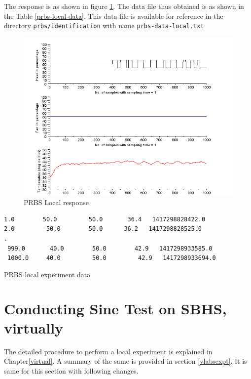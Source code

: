 The response is as shown in figure \ref{prbs-test-local}. The data file thus obtained is as shown in the Table \ref{prbs-local-data}. This data file is available for reference in the directory {\tt prbs/identification} with name {\tt prbs-data-local.txt}


\begin{figure}
\centering
\includegraphics[width=0.7\linewidth]{prbs/prbs-local.png}
\caption{PRBS Local response}
\label{prbs-test-local}
\end{figure}

\begin{table}
\begin{verbatim}
1.0        50.0         50.0       36.4   1417298828422.0
2.0         50.0        50.0      36.2   1417298828525.0
.
 999.0       40.0        50.0        42.9   1417298933585.0
 1000.0     40.0         50.0         42.9   1417298933694.0
\end{verbatim}
\caption{PRBS local experiment data}
\label{prbs-local-data}
\end{table}

\section{Conducting Sine Test on SBHS, virtually}
The detailed procedure to perform a local experiment is explained in Chapter\ref{virtual}. A summary of the same is provided in section \ref{vlabsexpt}. It is same for this section with following changes.

